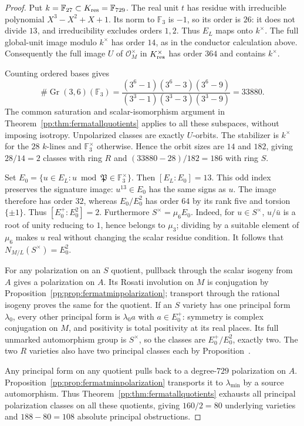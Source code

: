 \begin{proof}
Put $k=\mathbb F_{27}\subset K_{\rm res}=\mathbb F_{729}$.
The real unit $t$ has residue with irreducible polynomial
$X^3-X^2+X+1$. Its norm to $\mathbb F_3$ is $-1$, so its order
is $26$: it does not divide $13$, and irreducibility excludes orders
$1,2$. Thus $E_L$ maps onto $k^\times$. The full global-unit image
modulo $k^\times$ has order $14$, as in the conductor calculation
above. Consequently the full image $U$ of $\mathcal O_M^\times$
in $K_{\rm res}^\times$ has order $364$ and contains $k^\times$.

Counting ordered bases gives
\[
 \#\operatorname{Gr}(3,6)(\mathbb F_3)
 =\frac{(3^6-1)(3^6-3)(3^6-9)}{(3^3-1)(3^3-3)(3^3-9)}=33880.
\]
The common saturation and scalar-isomorphism argument in
Theorem~\ref{pp:thm:fermatallquotients} applies to all these subspaces,
without imposing isotropy. Unpolarized classes are exactly $U$-orbits.
The stabilizer is $k^\times$ for the $28$ $k$-lines and
$\mathbb F_3^\times$ otherwise. Hence the orbit sizes are $14$ and
$182$, giving $28/14=2$ classes with ring $R$ and
$(33880-28)/182=186$ with ring $S$.

Set $E_0=\{u\in E_L:u\bmod\mathfrak P\in\mathbb F_3^\times\}$.
Then $[E_L:E_0]=13$. This odd index preserves the signature image:
$u^{13}\in E_0$ has the same signs as $u$. The image therefore has
order $32$, whereas $E_0/E_0^2$ has order $64$ by its rank five and
torsion $\{\pm1\}$. Thus $[E_0^+:E_0^2]=2$.
Furthermore $S^\times=\mu_6E_0$. Indeed, for $u\in S^\times$,
$u/\bar u$ is a root of unity reducing to $1$, hence belongs to
$\mu_3$; dividing by a suitable element of $\mu_6$ makes $u$ real
without changing the scalar residue condition. It follows that
$N_{M/L}(S^\times)=E_0^2$.

For any polarization on an $S$ quotient, pullback through the scalar
isogeny from $A$ gives a polarization on $A$. Its Rosati involution on
$M$ is conjugation by Proposition~\ref{pp:prop:fermatminpolarization};
transport through the rational isogeny proves the same for the quotient.
If an $S$ variety has one principal form $\lambda_0$, every other
principal form is $\lambda_0 a$ with $a\in E_0^+$: symmetry is
complex conjugation on $M$, and positivity is total positivity at
its real places. Its full unmarked automorphism group is $S^\times$,
so the classes are $E_0^+/E_0^2$, exactly two. The two $R$ varieties
also have two principal classes each by
Proposition~.

Any principal form on any quotient pulls back to a degree-$729$
polarization on $A$. Proposition~\ref{pp:prop:fermatminpolarization}
transports it to $\lambda_{\min}$ by a source automorphism. Thus
Theorem~\ref{pp:thm:fermatallquotients} exhausts all principal polarization classes
on all these quotients, giving $160/2=80$ underlying varieties and
$188-80=108$ absolute principal obstructions.


\end{proof}
